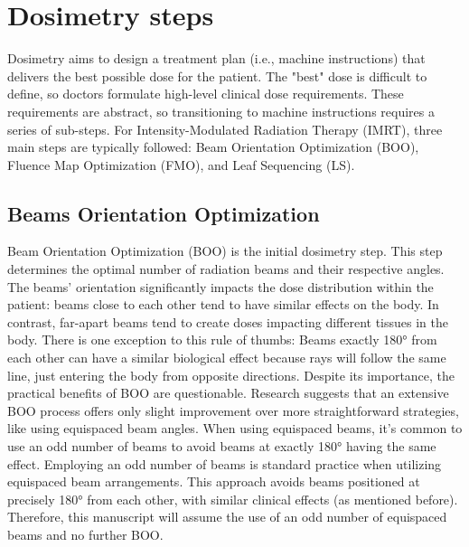 


\section{Dosimetry steps}
Dosimetry aims to design a treatment plan (i.e., machine instructions) that delivers the best possible dose for the patient.
The "best" dose is difficult to define, so doctors formulate high-level clinical dose requirements.
These requirements are abstract, so transitioning to machine instructions requires a series of sub-steps.
For Intensity-Modulated Radiation Therapy (IMRT), three main steps are typically followed: Beam Orientation Optimization (BOO), Fluence Map Optimization (FMO), and Leaf Sequencing (LS).
\subsection[BOO]{Beams Orientation Optimization}
Beam Orientation Optimization (BOO) is the initial dosimetry step.
This step determines the optimal number of radiation beams and their respective angles.
The beams' orientation significantly impacts the dose distribution within the patient: beams close to each other tend to have similar effects on the body.
In contrast, far-apart beams tend to create doses impacting different tissues in the body.
There is one exception to this rule of thumbs: Beams exactly 180° from each other can have a similar biological effect because rays will follow the same line, just entering the body from opposite directions.
Despite its importance, the practical benefits of BOO are questionable.
Research \cite{Rocha2019} suggests that an extensive BOO process offers only slight improvement over more straightforward strategies, like using equispaced beam angles.
When using equispaced beams, it's common to use an odd number of beams to avoid beams at exactly 180° having the same effect.
Employing an odd number of beams is standard practice when utilizing equispaced beam arrangements.
This approach avoids beams positioned at precisely 180° from each other, with similar clinical effects (as mentioned before).
Therefore, this manuscript will assume the use of an odd number of equispaced beams and no further BOO.

